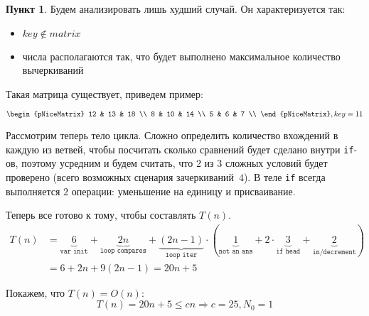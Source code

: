 \documentclass[11pt,a4paper]{scrarticle}
\theoremstyle{definition}
\newtheorem{subtask}{Пункт}
\begin{document}
\begin{subtask}
	Будем анализировать лишь худший случай. Он характеризуется так:
	\begin{itemize}
		\item $key \notin matrix$
		\item числа располагаются так, что будет выполнено максимальное количество вычеркиваний
	\end{itemize}

	Такая матрица существует, приведем пример:

	$$
		\begin{pNiceMatrix}
			12 & 13 & 18 \\
			8  & 10 & 14 \\
			5  & 6  & 7  \\
		\end{pNiceMatrix},
		key = 11
	$$

	Рассмотрим теперь тело цикла. Сложно определить количество вхождений в каждую из ветвей, чтобы посчитать сколько сравнений будет сделано внутри \texttt{if}-ов, поэтому усредним и будем считать, что $2$ из $3$ сложных условий будет проверено (всего возможных сценария зачеркиваний~$4$). В теле \texttt{if} всегда выполняется $2$ операции: уменьшение на единицу и присваивание.

	Теперь все готово к тому, чтобы составлять $T(n)$.
	\begin{align*}
		T(n) & = \underbrace{6}_{\texttt{var init}} + \underbrace{2n}_{\texttt{loop compares}} + \underbrace{(2n - 1)}_{\texttt{loop iter}} \cdot \left( \underbrace{1}_\texttt{not an ans} + 2 \cdot \underbrace{3}_{\texttt{if head}} + \underbrace{2}_{\texttt{in/decrement}} \right) \\
		     & = 6 + 2n + 9(2n - 1) = 20n + 5
	\end{align*}

	Покажем, что $T(n) = O(n)$:
	$$
		T(n) = 20n + 5 \le cn \Rightarrow c = 25, N_0 = 1
	$$
\end{subtask}
\end{document}
